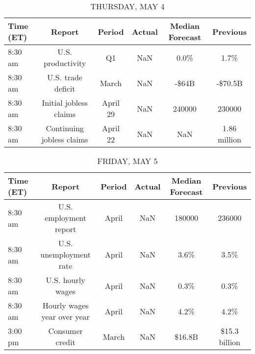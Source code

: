 \documentclass{article}%
\begin{document}
%


\begin{table}[htbp]%
\caption{THURSDAY, MAY 4}%
\centering%
\begin{adjustbox}{width=1\textwidth}%
\begin{tabular}{lccccc}
\toprule
Time (ET) &                    Report &   Period & Actual & Median Forecast &     Previous \\
\midrule
  8:30 am &         U.S. productivity &       Q1 &    NaN &            0.0\% &         1.7\% \\
  8:30 am &        U.S. trade deficit &    March &    NaN &           -\$64B &      -\$70.5B \\
  8:30 am &    Initial jobless claims & April 29 &    NaN &          240000 &       230000 \\
  8:30 am & Continuing jobless claims & April 22 &    NaN &             NaN & 1.86 million \\
\bottomrule
\end{tabular}
%
\end{adjustbox}%
\end{table}

%


\begin{table}[htbp]%
\caption{FRIDAY, MAY 5}%
\centering%
\begin{adjustbox}{width=1\textwidth}%
\begin{tabular}{lccccc}
\toprule
Time (ET) &                      Report & Period & Actual & Median Forecast &      Previous \\
\midrule
  8:30 am &      U.S. employment report &  April &    NaN &          180000 &        236000 \\
  8:30 am &      U.S. unemployment rate &  April &    NaN &            3.6\% &          3.5\% \\
  8:30 am &           U.S. hourly wages &  April &    NaN &            0.3\% &          0.3\% \\
  8:30 am & Hourly wages year over year &  April &    NaN &            4.2\% &          4.2\% \\
  3:00 pm &             Consumer credit &  March &    NaN &          \$16.8B & \$15.3 billion \\
\bottomrule
\end{tabular}
%
\end{adjustbox}%
\end{table}

%
\end{document}
